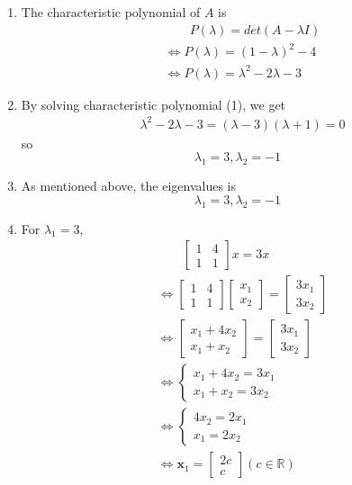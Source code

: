 \documentclass[11pt]{article}
\begin{document}
	\begin{enumerate}
		\item The characteristic polynomial of $A$ is 
		\begin{align}
			&\phantom{\Leftrightarrow\ \ }P(\lambda) = det(A - \lambda I)\nonumber\\
			&\Leftrightarrow P(\lambda) = (1 - \lambda)^2 - 4\nonumber\\
			&\Leftrightarrow P(\lambda) = \lambda^2 - 2\lambda - 3
		\end{align}
		\item By solving characteristic polynomial (1), we get
		\begin{align}
			&\lambda^2 - 2\lambda - 3 = (\lambda - 3)(\lambda + 1) = 0\nonumber
		\end{align}
		 so
		 \[\lambda_1 = 3, \lambda_2 = -1\]
		 \item As mentioned above, the eigenvalues is
		 \[\lambda_1 = 3, \lambda_2 = -1\]
		 \item For $\lambda_1 = 3$,
		 \begin{align}
		 	&\phantom{\Leftrightarrow\ \ }\begin{bmatrix}
		 		1 & 4\\
		 		1 & 1
		 	\end{bmatrix}
		 	x = 3x\nonumber\\
		 	&\Leftrightarrow\begin{bmatrix}
		 		1 & 4\\
		 		1 & 1
		 	\end{bmatrix}
		 	\begin{bmatrix}
		 		x_1\\
		 		x_2
		 	\end{bmatrix} = \begin{bmatrix}
		 		3x_1\\
		 		3x_2
		 	\end{bmatrix}\nonumber\\
		 	&\Leftrightarrow
		 	\begin{bmatrix}
		 		x_1 + 4x_2\\
		 		x_1 + x_2
		 	\end{bmatrix} = 
		 	\begin{bmatrix}
		 		3x_1\\
		 		3x_2
		 	\end{bmatrix}\nonumber\\
		 	&\Leftrightarrow
		 	\begin{cases}
		 		x_1 + 4x_2 = 3x_1\\
		 		x_1 + x_2 = 3x_2
		 	\end{cases}\nonumber\\
		 	&\Leftrightarrow 
		 	\begin{cases}
		 		4x_2 = 2x_1\\
		 		x_1 = 2x_2
		 	\end{cases}\nonumber\\
		 	&\Leftrightarrow 
		 	\mathbf{x}_1 = \begin{bmatrix}
		 		2c\\
		 		c
		 	\end{bmatrix} (c \in \mathbb{R})
		 \end{align}
		 

\end{enumerate}
\end{document}
